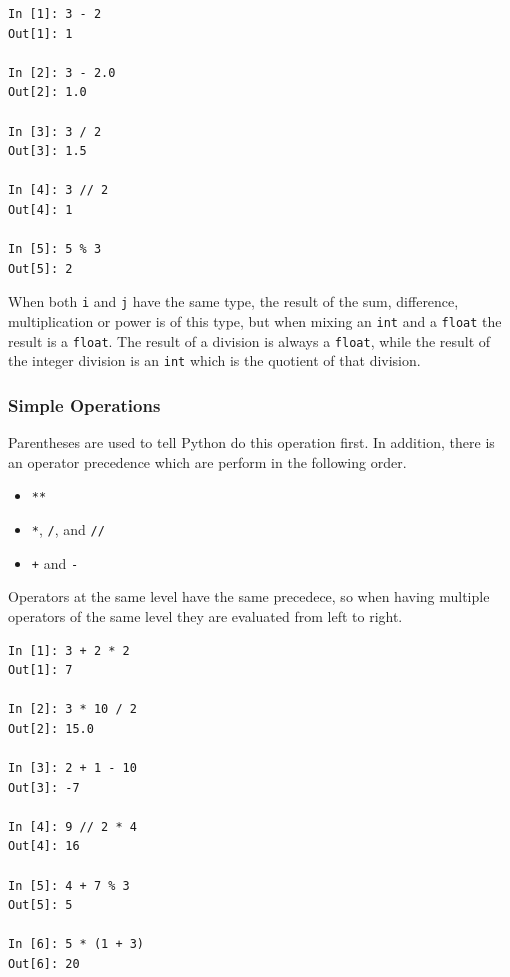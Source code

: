 \documentclass[a4paper]{article}
\newcommand{\inlinecode}{\texttt}
\begin{document}
\begin{lstlisting}
In [1]: 3 - 2
Out[1]: 1

In [2]: 3 - 2.0
Out[2]: 1.0

In [3]: 3 / 2
Out[3]: 1.5

In [4]: 3 // 2
Out[4]: 1

In [5]: 5 % 3
Out[5]: 2
\end{lstlisting}

When both \inlinecode{i} and \inlinecode{j} have the same type, the result of
the sum, difference, multiplication or power is of this type, but when mixing
an \inlinecode{int} and a \inlinecode{float} the result is a
\inlinecode{float}. The result of a division is always a \inlinecode{float},
while the result of the integer division is an \inlinecode{int} which is the
quotient of that division.

\subsubsection{Simple Operations}

Parentheses are used to tell Python do this operation first. In addition,
there is an operator precedence which are perform in the following order.

\begin{itemize}
  \item \inlinecode{**}
  \item \inlinecode{*},  \inlinecode{/}, and \inlinecode{//}
  \item \inlinecode{+} and \inlinecode{-}
\end{itemize}

Operators at the same level have the same precedece, so when having multiple
operators of the same level they are evaluated from left to right.

\begin{lstlisting}
In [1]: 3 + 2 * 2
Out[1]: 7

In [2]: 3 * 10 / 2
Out[2]: 15.0

In [3]: 2 + 1 - 10
Out[3]: -7

In [4]: 9 // 2 * 4
Out[4]: 16

In [5]: 4 + 7 % 3
Out[5]: 5

In [6]: 5 * (1 + 3)
Out[6]: 20
\end{lstlisting}
\end{document}
